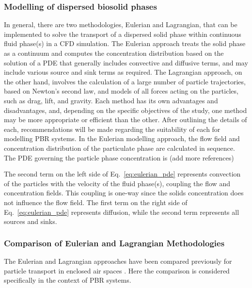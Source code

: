 \subsubsection{Modelling of dispersed biosolid phases}
\label{S:21}
In general, there are two methodologies, Eulerian and Lagrangian, that can be implemented to solve the transport of a dispersed solid phase within continuous fluid phase(s) in a CFD simulation. The Eulerian approach treats the solid phase as a continuum and computes the concentration distribution based on the solution of a PDE that generally includes convective and diffusive terms, and may include various source and sink terms as required.  The Lagrangian approach, on the other hand, involves the calculation of a large number of particle trajectories, based on Newton's second law, and models of all forces acting on the particles, such as drag, lift, and gravity. Each method has its own advantages and disadvantages, and, depending on the specific objectives of the study, one method may be more appropriate or efficient than the other.  After outlining the details of each, recommendations will be made regarding the suitability of each for modelling PBR systems.
\skippingparagraph
In the Eulerian modelling approach, the flow field and concentration distribution of the particulate phase are calculated in sequence.  The PDE governing the particle phase concentration is \cite{zhang2007} (add more references)



The second term on the left side of Eq.\ \ref{eq:eulerian_pde} represents convection of the particles with the velocity of the fluid phase(s), coupling the flow and concentration fields.  This coupling is one-way since the solids concentration does not influence the flow field.  The first term on the right side of Eq.\ \ref{eq:eulerian_pde} represents diffusion, while the second term represents all sources and sinks.

%


\subsubsection{Comparison of Eulerian and Lagrangian Methodologies}

The Eulerian and Lagrangian approaches have been compared previously for particle transport in enclosed air spaces \cite{zhang2007}. Here the comparison is considered specifically in the context of PBR systems.


